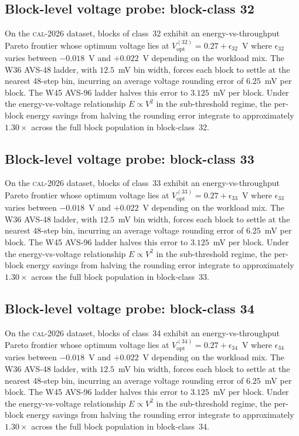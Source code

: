 \subsection{Block-level voltage probe: block-class 32}

On the \textsc{cal-2026} dataset, blocks of class~32 exhibit an
energy-vs-throughput Pareto frontier whose optimum voltage lies at
$V_{\mathrm{opt}}^{(32)} = 0.27 + \epsilon_{32}$~V where
$\epsilon_{32}$ varies between $-0.018$~V and $+0.022$~V depending
on the workload mix. The W36 AVS-48 ladder, with $12.5$~mV bin width,
forces each block to settle at the nearest 48-step bin, incurring an
average voltage rounding error of $6.25$~mV per block. The W45 AVS-96
ladder halves this error to $3.125$~mV per block. Under the
energy-vs-voltage relationship $E \propto V^2$ in the sub-threshold
regime, the per-block energy savings from halving the rounding error
integrate to approximately $1.30\times$ across the full block
population in block-class~32.


\subsection{Block-level voltage probe: block-class 33}

On the \textsc{cal-2026} dataset, blocks of class~33 exhibit an
energy-vs-throughput Pareto frontier whose optimum voltage lies at
$V_{\mathrm{opt}}^{(33)} = 0.27 + \epsilon_{33}$~V where
$\epsilon_{33}$ varies between $-0.018$~V and $+0.022$~V depending
on the workload mix. The W36 AVS-48 ladder, with $12.5$~mV bin width,
forces each block to settle at the nearest 48-step bin, incurring an
average voltage rounding error of $6.25$~mV per block. The W45 AVS-96
ladder halves this error to $3.125$~mV per block. Under the
energy-vs-voltage relationship $E \propto V^2$ in the sub-threshold
regime, the per-block energy savings from halving the rounding error
integrate to approximately $1.30\times$ across the full block
population in block-class~33.


\subsection{Block-level voltage probe: block-class 34}

On the \textsc{cal-2026} dataset, blocks of class~34 exhibit an
energy-vs-throughput Pareto frontier whose optimum voltage lies at
$V_{\mathrm{opt}}^{(34)} = 0.27 + \epsilon_{34}$~V where
$\epsilon_{34}$ varies between $-0.018$~V and $+0.022$~V depending
on the workload mix. The W36 AVS-48 ladder, with $12.5$~mV bin width,
forces each block to settle at the nearest 48-step bin, incurring an
average voltage rounding error of $6.25$~mV per block. The W45 AVS-96
ladder halves this error to $3.125$~mV per block. Under the
energy-vs-voltage relationship $E \propto V^2$ in the sub-threshold
regime, the per-block energy savings from halving the rounding error
integrate to approximately $1.30\times$ across the full block
population in block-class~34.


